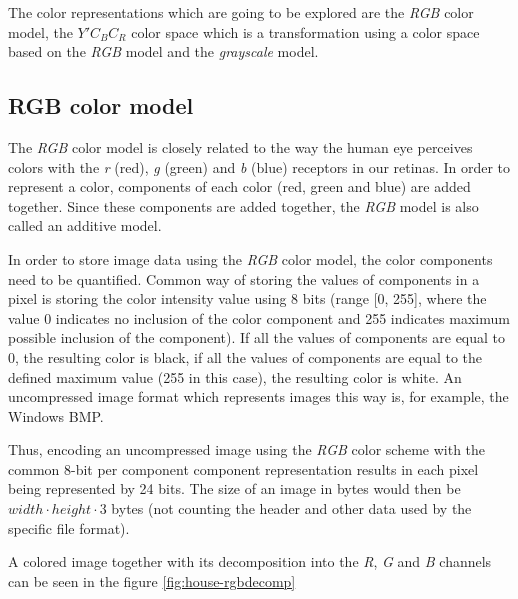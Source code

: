 \documentclass[thesis=M,english]{FITthesis}[2012/10/20]
\begin{document}
The color representations which are going to be explored are the \emph{RGB} color model, the $Y'C_{B}C_{R}$ color
space which is a transformation using a color space based on the \emph{RGB} model and the
\emph{grayscale} model.

\subsection{RGB color model}
The \emph{RGB} color model is closely related to the way the human eye perceives colors
with the \emph{r} (red), \emph{g} (green) and \emph{b} (blue) receptors in our retinas.\cite{img:color-theory}
In order to represent a color, components of each color (red, green and blue) are added together.
Since these components are added together, the \emph{RGB} model is also called an additive model.

In order to store image data using the \emph{RGB} color model, the color components
need to be quantified. Common way of storing the values of components in a pixel
is storing the color intensity value using 8 bits (range [0, 255], where the
value 0 indicates no inclusion of the color component and 255 indicates maximum
possible inclusion of the component). If all the values of components are
equal to 0, the resulting color is black, if all the values of components are
equal to the defined maximum value (255 in this case), the resulting color
is white. An uncompressed image format which represents images this way is, for
example, the Windows BMP.\cite{fileformat-bmp}

Thus, encoding an uncompressed image using the \emph{RGB} color scheme with
the common 8-bit per component component representation results in each pixel
being represented by 24 bits. The size of an image in bytes would then be
$width \cdot height \cdot 3$ bytes (not counting the header and other data used by the
specific file format).

A colored image together with its decomposition into the \emph{R}, \emph{G}
and \emph{B} channels can be seen in the figure \ref{fig:house-rgbdecomp}
\end{document}
